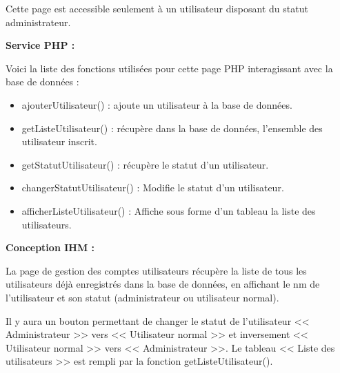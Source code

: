 \begin{paragraphe}
			\begin{paragraphe}
				Cette page est accessible seulement à un utilisateur disposant du statut administrateur.
			\end{paragraphe}

			\begin{paragraphe}
				\textbf{Service PHP :}
			\end{paragraphe}

			\begin{paragraphe}
				Voici la liste des fonctions utilisées pour cette page PHP interagissant avec la base de données :
				\begin{itemize}
					\item ajouterUtilisateur() : ajoute un utilisateur à la base de données.
					\item getListeUtilisateur() : récupère dans la base de données, l'ensemble des utilisateur inscrit.
					\item getStatutUtilisateur() : récupère le statut d'un utilisateur.
					\item changerStatutUtilisateur() : Modifie le statut d'un utilisateur.
					\item afficherListeUtilisateur() : Affiche sous forme d'un tableau la liste des utilisateurs.
				\end{itemize}
			\end{paragraphe}

			\begin{paragraphe}
				\textbf{Conception IHM :}
			\end{paragraphe}

			\begin{paragraphe}
				La page de gestion des comptes utilisateurs récupère la liste de tous les utilisateurs déjà enregistrés dans la base de données, en affichant le nm de l'utilisateur et son statut (administrateur ou utilisateur normal).
			\end{paragraphe}

			\begin{paragraphe}
				Il y aura un bouton permettant de changer le statut de l'utilisateur << Administrateur >> vers << Utilisateur normal >> et inversement << Utilisateur normal >> vers << Administrateur >>. Le tableau << Liste des utilisateurs >> est rempli par la fonction getListeUtilisateur().
			\end{paragraphe}



\end{paragraphe}
